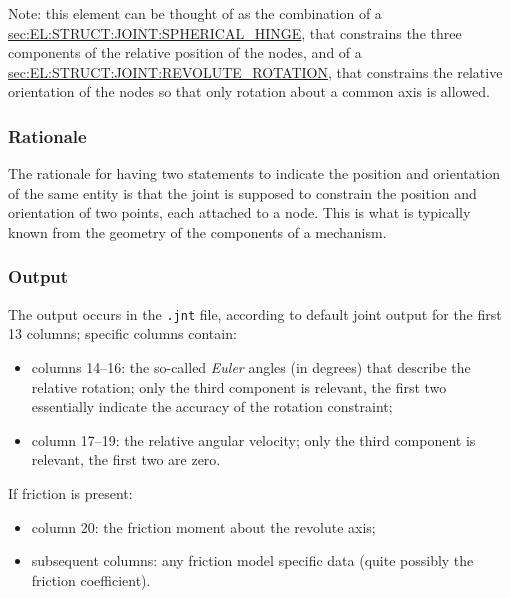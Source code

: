 Note: this element can be thought of as the combination of a 
\hyperref{\kw{spherical hinge}}{\kw{spherical hinge} (see Section~}{)}{sec:EL:STRUCT:JOINT:SPHERICAL_HINGE},
that constrains the three components of the relative position
of the nodes, and of a
\hyperref{\kw{revolute rotation}}{\kw{revolute rotation} (see Section~}{)}{sec:EL:STRUCT:JOINT:REVOLUTE_ROTATION},
that constrains the relative orientation of the nodes so that only rotation
about a common axis is allowed.

\subsubsection{Rationale}
The rationale for having two statements to indicate the position
and orientation of the same entity is that the joint is supposed
to constrain the position and orientation of two points,
each attached to a node.
This is what is typically known from the geometry of the components
of a mechanism.

\subsubsection{Output}
The output occurs in the \texttt{.jnt} file, according to default joint output
for the first 13 columns; specific columns contain:
\begin{itemize}
\item columns 14--16: the so-called \emph{Euler} angles (in degrees)
	that describe the relative rotation; only the third component
	is relevant, the first two essentially indicate the accuracy
	of the rotation constraint;
\item column 17--19: the relative angular velocity; only the third component
	is relevant, the first two are zero.
\end{itemize}
If friction is present:
\begin{itemize}
\item column 20: the friction moment about the revolute axis;
\item subsequent columns: any friction model specific data (quite possibly the friction coefficient).
\end{itemize}

